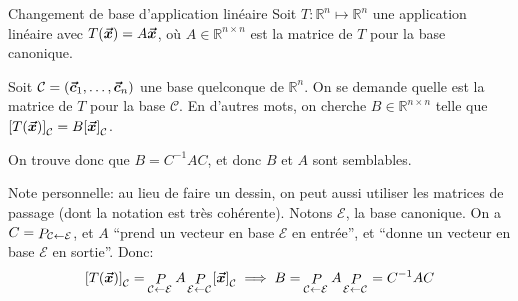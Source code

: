 \documentclass[a4paper]{article}
\begin{document}
\begin{parag}{Changement de base d'application linéaire}
    Soit $T : \mathbb{R}^n \mapsto \mathbb{R}^n$ une application linéaire avec $T\left(\bvec{x}\right) = A \bvec{x}$, où $A \in \mathbb{R}^{n \times n}$ est la matrice de $T$ pour la base canonique.

    Soit $\mathcal{C} = \left(\bvec{c}_1, \ldots, \bvec{c}_n\right)$ une base quelconque de $\mathbb{R}^n$. On se demande quelle est la matrice de $T$ pour la base $\mathcal{C}$. En d'autres mots, on cherche $B \in \mathbb{R}^{n \times n}$ telle que $\left[T\left(\bvec{x}\right)\right]_{\mathcal{C}} = B\left[\bvec{x}\right]_{\mathcal{C}}$.


    On trouve donc que $B = C^{-1} A C$, et donc $B$ et $A$ sont semblables.

    Note personnelle: au lieu de faire un dessin, on peut aussi utiliser les matrices de passage (dont la notation est très cohérente). Notons $\mathcal{E}$, la base canonique. On a $C = \mathop{P}_{\mathcal{C} \leftarrow \mathcal{E}}$, et $A$ ``prend un vecteur en base $\mathcal{E}$ en entrée'', et ``donne un vecteur en base $\mathcal{E}$ en sortie''. Donc:
    \[\left[T\left(\bvec{x}\right)\right]_{\mathcal{C}} = \matricepassage{C}{E} A \matricepassage{E}{C} \left[\bvec{x}\right]_{\mathcal{C}} \implies B = \matricepassage{C}{E} A \matricepassage{E}{C} = C^{-1} A C\]
\end{parag}
\end{document}
